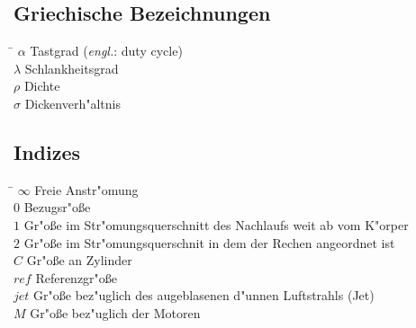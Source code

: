 \subsection*{Griechische Bezeichnungen}
\begin{tabbing}
\hspace*{2cm}\=\kill
$\alpha$ \> Tastgrad (\textit{engl.}: duty cycle) \\[0.2ex]
$\lambda$ \> Schlankheitsgrad \\[0.2ex]
$\rho$ \> Dichte \\[0.2ex]
$\sigma$ \> Dickenverh"altnis \\[0.2ex]

\end{tabbing}



\subsection*{Indizes}
\begin{tabbing}
\hspace*{2cm}\=\kill
$\infty$ \> Freie Anstr"omung \\[0.2ex]
$0$ \> Bezugsr"o\ss{}e \\[0.2ex]
$1$ \> Gr"o\ss{}e im Str"omungsquerschnitt des Nachlaufs weit ab vom K"orper \\[0.2ex]
$2$ \> Gr"o\ss{}e im Str"omungsquerschnit in dem der Rechen angeordnet ist \\[0.2ex]
$C$ \> Gr"o\ss{}e an Zylinder \\[0.2ex]
$ref$ \> Referenzgr"o\ss{}e \\[0.2ex]
$jet$ \> Gr"o\ss{}e bez"uglich des augeblasenen d"unnen Luftstrahls (Jet) \\[0.2ex]
$M$ \> Gr"o\ss{}e bez"uglich der Motoren \\[0.2ex]
\end{tabbing}




